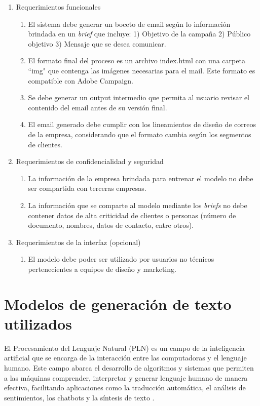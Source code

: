 \begin{enumerate}
	\item Requerimientos funcionales
		\begin{enumerate}
			\item El sistema debe generar un boceto de email según lo información brindada en un \textit{brief} que incluye: 1) Objetivo de la campaña 2) Público objetivo 3) Mensaje que se desea comunicar.
			\item El formato final del proceso es un archivo index.html con una carpeta ``img"  que contenga las imágenes necesarias para el mail. Este formato es compatible con Adobe Campaign.
			\item Se debe generar un output intermedio que permita al usuario revisar el contenido del email antes de su versión final.
			\item El email generado debe cumplir con los lineamientos de diseño de correos de la empresa, considerando que el formato cambia según los segmentos de clientes.
		\end{enumerate}
	\item Requerimientos de confidencialidad y seguridad
		\begin{enumerate}
			\item La información de la empresa brindada para entrenar el modelo no debe ser compartida con terceras empresas.
			\item La información que se comparte al modelo mediante los \textit{briefs} no debe contener datos de alta criticidad de clientes o personas (número de documento, nombres, datos de contacto, entre otros).
		\end{enumerate}
	\item Requerimientos de la interfaz (opcional)
		\begin{enumerate}
			\item El modelo debe poder ser utilizado por usuarios no técnicos pertenecientes a equipos de diseño y marketing.
		\end{enumerate}
\end{enumerate}

\section{Modelos de generación de texto utilizados}

El Procesamiento del Lenguaje Natural (PLN) es un campo de la inteligencia artificial que se encarga de la interacción entre las computadoras y el lenguaje humano. Este campo abarca el desarrollo de algoritmos y sistemas que permiten a las máquinas comprender, interpretar y generar lenguaje humano de manera efectiva, facilitando aplicaciones como la traducción automática, el análisis de sentimientos, los chatbots y la síntesis de texto \cite{jurafsky2021}.

